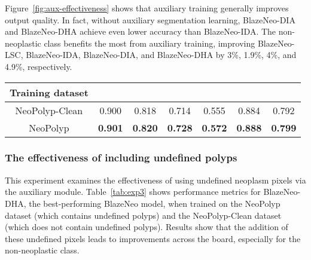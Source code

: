 \documentclass{ieeeaccess}
\newcommand{\ModelName}{BlazeNeo\xspace}
\newcommand{\DHA}{BlazeNeo-DHA\xspace}
\newcommand{\DIA}{BlazeNeo-DIA\xspace}
\newcommand{\IDA}{BlazeNeo-IDA\xspace}
\newcommand{\LSC}{BlazeNeo-LSC\xspace}
\newcommand{\DatasetName}{NeoPolyp\xspace}
\newcommand{\CleanDatasetName}{NeoPolyp-Clean\xspace}
\begin{document}
Figure~\ref{fig:aux-effectiveness} shows that auxiliary training generally improves output quality. In fact, without auxiliary segmentation learning, \DIA and \DHA achieve even lower accuracy than \IDA. The non-neoplastic class benefits the most from auxiliary training, improving \LSC, \IDA, \DIA, and \DHA by 3\%, 1.9\%, 4\%, and 4.9\%, respectively.



\begin{table*}[ht!]
    \centering
    \caption{Performance metrics for \DHA when training on \DatasetName and \CleanDatasetName, measured on the \DatasetName test set}
    \label{tab:exp3}
    \begin{tabular}{@{} c| c c c c c c @{}}
        \toprule
        
        \multicolumn{1}{c|}{Training dataset} & \multicolumn{1}{c}{} & \multicolumn{1}{c}{} & \multicolumn{1}{c}{} & \multicolumn{1}{c}{} & \multicolumn{1}{c}{} & \multicolumn{1}{c}{} \\ \midrule \midrule
        \CleanDatasetName                     & 0.900                                   & 0.818                                  & 0.714                                   & 0.555                                  & 0.884                                   & 0.792                                  \\
        \DatasetName                          & \textbf{0.901}                          & \textbf{0.820}                         & \textbf{0.728}                          & \textbf{0.572}                         & \textbf{0.888}                          & \textbf{0.799}                         \\
        
        \bottomrule
    \end{tabular}
\end{table*}

\subsubsection{The effectiveness of including undefined polyps}
This experiment examines the effectiveness of using undefined neoplasm pixels via the auxiliary module. Table~\ref{tab:exp3} shows performance metrics for \DHA, the best-performing \ModelName model, when trained on the \DatasetName dataset (which contains undefined polyps) and the \CleanDatasetName dataset (which does not contain undefined polyps). Results show that the addition of these undefined pixels leads to improvements across the board, especially for the non-neoplastic class.
\end{document}
